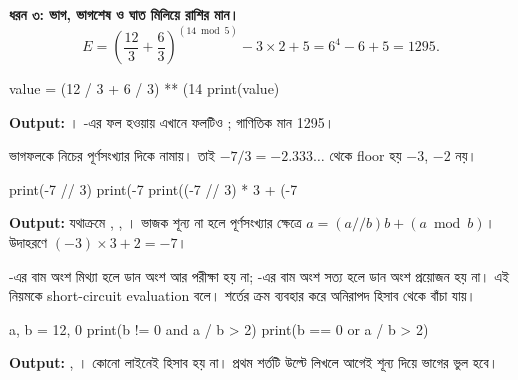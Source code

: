 \textbf{ধরন ৩: ভাগ, ভাগশেষ ও ঘাত মিলিয়ে রাশির মান।}
\[
E=\left(\frac{12}{3}+\frac{6}{3}\right)^{(14\bmod 5)}-3\times2+5
  =6^4-6+5=1295.
\]
\begin{pythoncode}
value = (12 / 3 + 6 / 3) ** (14 %
print(value)
\end{pythoncode}
\textbf{Output:} । \py{/}-এর ফল  হওয়ায়
এখানে ফলটিও ; গাণিতিক মান 1295।


\py{//} ভাগফলকে নিচের পূর্ণসংখ্যার দিকে নামায়। তাই
\(-7/3=-2.333\ldots\) থেকে floor হয় \(-3\), \(-2\) নয়।
\begin{pythoncode}
print(-7 // 3)
print(-7 %
print((-7 // 3) * 3 + (-7 %
\end{pythoncode}
\textbf{Output:} যথাক্রমে , , ।
ভাজক শূন্য না হলে পূর্ণসংখ্যার ক্ষেত্রে
\(a=(a\mathbin{//}b)b+(a\bmod b)\)। উদাহরণে \((-3)\times3+2=-7\)।


-এর বাম অংশ মিথ্যা হলে ডান অংশ আর পরীক্ষা হয় না;
-এর বাম অংশ সত্য হলে ডান অংশ প্রয়োজন হয় না। এই নিয়মকে
short-circuit evaluation বলে। শর্তের ক্রম ব্যবহার করে অনিরাপদ হিসাব
থেকে বাঁচা যায়।
\begin{pythoncode}
a, b = 12, 0
print(b != 0 and a / b > 2)
print(b == 0 or a / b > 2)
\end{pythoncode}
\textbf{Output:} , । কোনো লাইনেই 
হিসাব হয় না। প্রথম শর্তটি উল্টে  লিখলে
আগেই শূন্য দিয়ে ভাগের ভুল হবে।

